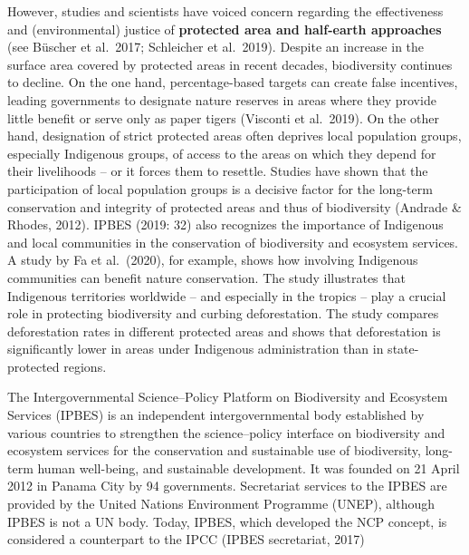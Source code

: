 \documentclass[
  a4paper,
  openany]{book}
\begin{document}
However, studies and scientists have voiced concern regarding the
effectiveness and (environmental) justice of \textbf{protected area and
half-earth approaches} (see Büscher et al.~2017; Schleicher et
al.~2019). Despite an increase in the surface area covered by protected
areas in recent decades, biodiversity continues to decline. On the one
hand, percentage-based targets can create false incentives, leading
governments to designate nature reserves in areas where they provide
little benefit or serve only as paper tigers (Visconti et al.~2019). On
the other hand, designation of strict protected areas often deprives
local population groups, especially Indigenous groups, of access to the
areas on which they depend for their livelihoods -- or it forces them to
resettle. Studies have shown that the participation of local population
groups is a decisive factor for the long-term conservation and integrity
of protected areas and thus of biodiversity (Andrade \& Rhodes, 2012).
IPBES (2019: 32) also recognizes the importance of Indigenous and local
communities in the conservation of biodiversity and ecosystem services.
A study by Fa et al.~(2020), for example, shows how involving Indigenous
communities can benefit nature conservation. The study illustrates that
Indigenous territories worldwide -- and especially in the tropics --
play a crucial role in protecting biodiversity and curbing
deforestation. The study compares deforestation rates in different
protected areas and shows that deforestation is significantly lower in
areas under Indigenous administration than in state-protected regions.

\begin{tcolorbox}[enhanced jigsaw, coltitle=black, bottomtitle=1mm, opacitybacktitle=0.6, titlerule=0mm, opacityback=0, leftrule=.75mm, colbacktitle=quarto-callout-note-color!10!white, bottomrule=.15mm, toptitle=1mm, breakable, title={What is IPBES?}, arc=.35mm, rightrule=.15mm, toprule=.15mm, left=2mm, colback=white, colframe=quarto-callout-note-color-frame]

The Intergovernmental Science--Policy Platform on Biodiversity and
Ecosystem Services (IPBES) is an independent intergovernmental body
established by various countries to strengthen the science--policy
interface on biodiversity and ecosystem services for the conservation
and sustainable use of biodiversity, long-term human well-being, and
sustainable development. It was founded on 21 April 2012 in Panama City
by 94 governments. Secretariat services to the IPBES are provided by the
United Nations Environment Programme (UNEP), although IPBES is not a UN
body. Today, IPBES, which developed the NCP concept, is considered a
counterpart to the IPCC (IPBES secretariat, 2017)

\end{tcolorbox}
\end{document}
